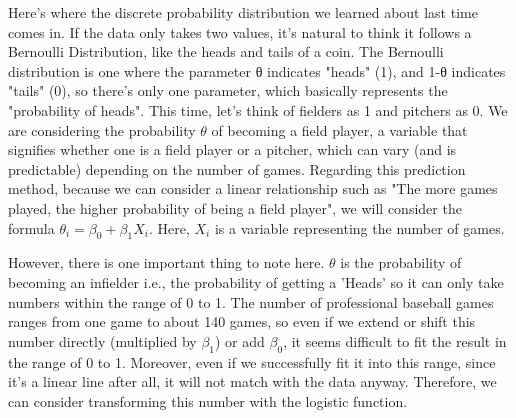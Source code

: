 \documentclass{ltjsbook}
\begin{document}
Here's where the discrete probability distribution we learned about last time comes in. If the data only takes two values, it's natural to think it follows a Bernoulli Distribution, like the heads and tails of a coin. The Bernoulli distribution is one where the parameter θ indicates "heads" (1), and 1-θ indicates "tails" (0), so there's only one parameter, which basically represents the "probability of heads".
This time, let's think of fielders as 1 and pitchers as 0. We are considering the probability $\theta$ of becoming a field player, a variable that signifies whether one is a field player or a pitcher, which can vary (and is predictable) depending on the number of games.
Regarding this prediction method, because we can consider a linear relationship such as "The more games played, the higher probability of being a field player", we will consider the formula $\theta_i = \beta_0 + \beta_1 X_i$. Here, $X_i$ is a variable representing the number of games.

However, there is one important thing to note here. $\theta$ is the probability of becoming an infielder i.e., the probability of getting a 'Heads' so it can only take numbers within the range of 0 to 1. The number of professional baseball games ranges from one game to about 140 games, so even if we extend or shift this number directly (multiplied by $\beta_1$) or add $\beta_0$, it seems difficult to fit the result in the range of 0 to 1. Moreover, even if we successfully fit it into this range, since it's a linear line after all, it will not match with the data anyway. Therefore, we can consider transforming this number with the logistic function.
\end{document}
